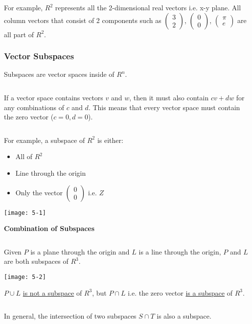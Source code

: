 \documentclass[12pt]{article}
\begin{document}
$\>$

For example, $R^2$ represents all the 2-dimensional real vectors i.e. x-y plane. All column vectors that consist of 2 components such as 
$\left(
    \begin{matrix}
        3\\
        2 
    \end{matrix}
\right)$,
$\left(
    \begin{matrix}
        0\\
        0 
    \end{matrix}
\right)$,
$\left(
    \begin{matrix}
        \pi\\
        e 
    \end{matrix}
\right)$
are all part of $R^2$.

\subsubsection{Vector Subspaces}
Subspaces are vector spaces inside of $R^n$.

$\>$

If a vector space contains vectors $v$ and $w$, then it must also contain $cv+dw$ for any combinations of $c$ and $d$. This means that every vector space must contain the zero vector ($c=0, d=0$).

$\>$

\begin{multicols}{2}
For example, a subspace of $R^2$ is either:
\begin{itemize}
    \item All of $R^2$
    \item Line through the origin
    \item Only the vector $\left(\begin{matrix}0\\0\end{matrix}\right)$ i.e. $Z$
\end{itemize}

\texttt{[image: 5-1]}
\end{multicols}

\textbf{Combination of Subspaces}

$\>$

Given $P$ is a plane through the origin and $L$ is a line through the origin, $P$ and $L$ are both subspaces of $R^3$. 

\texttt{[image: 5-2]}

$P\cup{L}$ \underline{is not a subspace} of $R^3$, but $P\cap{L}$ i.e. the zero vector \underline{is a subspace} of $R^3$.

$\>$

In general, the intersection of two subspaces $S\cap{T}$ is also a subspace.
\end{document}
